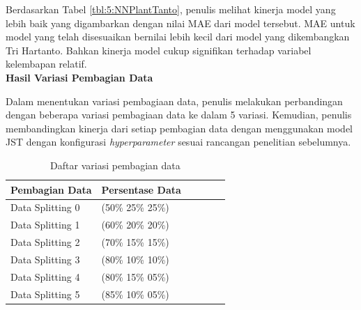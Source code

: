 
Berdasarkan Tabel \ref{tbl:5:NNPlantTanto}, penulis melihat kinerja model yang lebih baik yang digambarkan dengan nilai MAE dari model tersebut. MAE untuk model yang telah disesuaikan bernilai lebih kecil dari model yang dikembangkan Tri Hartanto. Bahkan kinerja model cukup signifikan terhadap variabel kelembapan relatif.\\

\noindent \textbf{Hasil Variasi Pembagian Data} 

Dalam menentukan variasi pembagiaan data, penulis melakukan perbandingan dengan beberapa variasi pembagiaan data ke dalam 5 variasi. Kemudian, penulis membandingkan kinerja dari setiap pembagian data dengan menggunakan model JST dengan konfigurasi \textit{hyperparameter} sesuai rancangan penelitian sebelumnya\cite{skripsiTanto}.

\begin{table}[h!]
	\caption{Daftar variasi pembagian data}
	\label{tbl:5:DataSplitting}
	\centering
	\begin{tabular}{|p{3cm}|p{3cm}|p{1.5cm}|p{1cm}|p{1.5cm}|p{1cm}|}
		\hline
		Pembagian Data   & Persentase Data \\ \hline
		Data Splitting 0 & (50\% 25\% 25\%)\\ \hline
		Data Splitting 1 & (60\% 20\% 20\%)\\ \hline
		Data Splitting 2 & (70\% 15\% 15\%)\\ \hline
		Data Splitting 3 & (80\% 10\% 10\%)\\ \hline
		Data Splitting 4 & (80\% 15\% 05\%)\\ \hline
		Data Splitting 5 & (85\% 10\% 05\%)\\ \hline
	\end{tabular}
\end{table}

